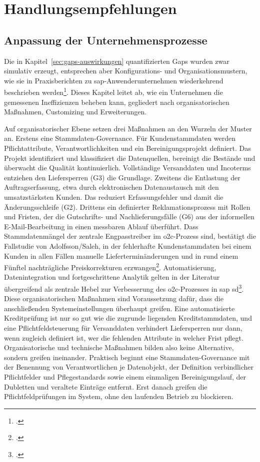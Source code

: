 \chapter{Handlungsempfehlungen}\label{ch:empfehlungen}


\section{Anpassung der Unternehmensprozesse}\label{sec:anpassung-unternehmensprozesse}

Die in Kapitel~\ref{sec:gaps-auswirkungen} quantifizierten Gaps wurden zwar simulativ erzeugt, entsprechen aber Konfigurations- und Organisationsmustern, wie sie in Praxisberichten zu \gls{sap}-Anwender\-unternehmen wiederkehrend beschrieben werden\footcites(Vgl.)()[S.~3 ff.]{reinkemeyer2020processmining}[S.~21 ff.]{peters2019processmining}. Dieses Kapitel leitet ab, wie ein Unternehmen die gemessenen Ineffizienzen beheben kann, gegliedert nach organisatorischen Maßnahmen, Customizing und Erweiterungen.

Auf organisatorischer Ebene setzen drei Maßnahmen an den Wurzeln der Muster an. Erstens eine Stammdaten-Governance. Für Kundenstammdaten werden Pflichtattribute, Verantwortlichkeiten und ein Bereinigungsprojekt definiert. Das Projekt identifiziert und klassifiziert die Datenquellen, bereinigt die Bestände und überwacht die Qualität kontinuierlich. Vollständige Versanddaten und Incoterms entziehen den Liefersperren (G3) die Grundlage. Zweitens die Entlastung der Auftragserfassung, etwa durch elektronischen Datenaustausch mit den umsatzstärksten Kunden. Das reduziert Erfassungsfehler und damit die Änderungsschleife (G2). Drittens ein definierter Reklamationsprozess mit Rollen und Fristen, der die Gutschrifts- und Nachlieferungsfälle (G6) aus der informellen E-Mail-Bearbeitung in einen messbaren Ablauf überführt. Dass Stammdatenmängel der zentrale Engpasstreiber im \gls{o2c}-Prozess sind, bestätigt die Fallstudie von Adolfsson/Saleh, in der fehlerhafte Kundenstammdaten bei einem Kunden in allen Fällen manuelle Lieferterminänderungen und in rund einem Fünftel nachträgliche Preiskorrekturen erzwangen\footcite[Vgl.][S.~55 f.\ und 61]{adolfsson2026o2c}. Automatisierung, Datenintegration und fortgeschrittene Analytik gelten in der Literatur übergreifend als zentrale Hebel zur Verbesserung des \gls{o2c}-Prozesses in \gls{sap} \gls{sd}\footcite[Vgl.][S.~110 ff.]{nadukuru2024o2c}. Diese organisatorischen Maßnahmen sind Voraussetzung dafür, dass die anschließenden Systemeinstellungen überhaupt greifen. Eine automatisierte Kreditprüfung ist nur so gut wie die zugrunde liegenden Kreditstammdaten, und eine Pflichtfeldsteuerung für Versanddaten verhindert Liefersperren nur dann, wenn zugleich definiert ist, wer die fehlenden Attribute in welcher Frist pflegt. Organisatorische und technische Maßnahmen bilden also keine Alternative, sondern greifen ineinander. Praktisch beginnt eine Stammdaten-Governance mit der Benennung von Verantwortlichen je Datenobjekt, der Definition verbindlicher Pflichtfelder und Pflegestandards sowie einem einmaligen Bereinigungslauf, der Dubletten und veraltete Einträge entfernt. Erst danach greifen die Pflichtfeldprüfungen im System, ohne den laufenden Betrieb zu blockieren.

